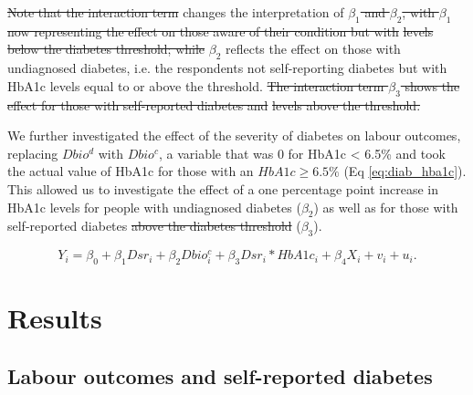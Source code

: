 \documentclass[12pt,english]{article}
\providecommand{\DIFaddtex}[1]{{\protect\color{blue}\uwave{#1}}} %
\providecommand{\DIFdeltex}[1]{{\protect\color{red}\sout{#1}}}                      %
\providecommand{\DIFaddbegin}{} %
\providecommand{\DIFaddend}{} %
\providecommand{\DIFdelbegin}{} %
\providecommand{\DIFdelend}{} %
\providecommand{\DIFadd}[1]{\texorpdfstring{\DIFaddtex{#1}}{#1}} %
\providecommand{\DIFdel}[1]{\texorpdfstring{\DIFdeltex{#1}}{}} %
\begin{document}
\DIFdelbegin \DIFdel{Note that the interaction term }\DIFdelend \DIFaddbegin \DIFadd{This }\DIFaddend changes the interpretation of \DIFdelbegin \DIFdel{$\beta_{1}$ and $\beta_{2}$, with $\beta_{1}$ now representing the effect on those aware of their condition but with }%
\DIFdel{levels below the diabetes threshold; while }\DIFdelend $\beta_{2}$ \DIFaddbegin \DIFadd{which now }\DIFaddend reflects the effect on those with undiagnosed diabetes, i.e. the respondents not self-reporting diabetes but with \ac{HbA1c} levels equal to or above the threshold. 
\DIFdelbegin \DIFdel{The interaction term $\beta_{3}$ shows the effect for those with self-reported diabetes and }%
\DIFdel{levels above the threshold.
}\DIFdelend 

We further investigated the effect of the severity of diabetes on labour outcomes, replacing $Dbio^{d}$ with $Dbio^{c}$, a variable that was $0$ for \ac{HbA1c} < 6.5\% and took the actual value of \ac{HbA1c} \DIFaddbegin \DIFadd{minus 6.4 }\DIFaddend for those with an $HbA1c \geq 6.5\%$ (Eq \ref{eq:diab_hba1c}). This allowed us to investigate the effect of a one percentage point increase in \ac{HbA1c} levels for people with undiagnosed diabetes ($\beta_{2}$) as well as for those with self-reported diabetes \DIFdelbegin \DIFdel{above the diabetes threshold }\DIFdelend ($\beta_{3}$).

\begin{equation}
Y_{i}=\beta_{0}+\beta_{1}Dsr_{i}+\beta_{2}Dbio^{c}_{i}+\beta_{3}Dsr_{i}*HbA1c_{i}+\beta_{4}X_{i}+v_{i}+u_{i}.\label{eq:diab_hba1c}
\end{equation}

\section{\label{sec:cha_4_results}Results}


\subsection{Labour outcomes and self-reported diabetes}
\end{document}
